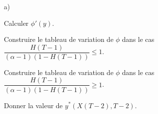 \documentclass[11pt]{article}%
\begin{document}
    

  \begin{noliste}{a)}
    \setcounter{enumi}{6}
    \setlength{\itemsep}{2mm}
    \item Calculer $\phi'(y)$.
    
    
    
    \item Construire le tableau de variation de $\phi$ dans le cas 
    $\dfrac{H(T-1)}{(\alpha-1)(1-H(T-1))} \leq 1$.
    
    
    
    \item Construire le tableau de variation de $\phi$ dans le cas 
    $\dfrac{H(T-1)}{(\alpha-1)(1-H(T-1))} \geq 1$.
    
    

    
    \item Donner la valeur de $y^*(X(T-2),T-2)$.
    
    
  \end{noliste}
\end{document}
